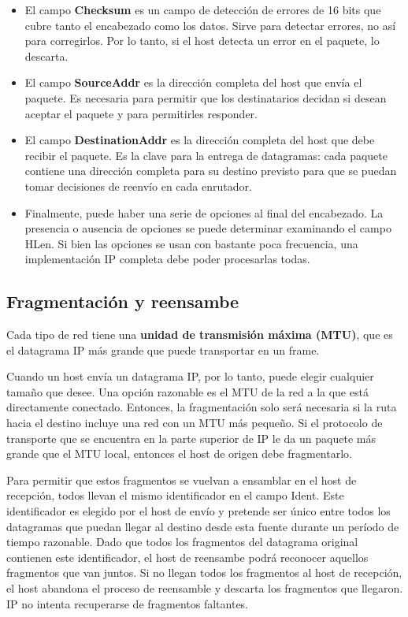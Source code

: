 \begin{itemize}
  \item El campo \textbf{Checksum} es un campo de detección de errores de 16 bits que cubre tanto el encabezado como los datos. Sirve para detectar errores, no así para corregirlos. Por lo tanto, si el host detecta un error en el paquete, lo descarta.
  \item El campo \textbf{SourceAddr} es la dirección completa del host que envía el paquete. Es necesaria para permitir que los destinatarios decidan si desean aceptar el paquete y para permitirles responder.
  \item El campo \textbf{DestinationAddr} es la dirección completa del host que debe recibir el paquete.  Es la clave para la entrega de datagramas: cada paquete contiene una dirección completa para su destino previsto para que se puedan tomar decisiones de reenvío en cada enrutador.
  \item Finalmente, puede haber una serie de opciones al final del encabezado. La presencia o ausencia de opciones se puede determinar examinando el campo HLen. Si bien las opciones se usan con bastante poca frecuencia, una implementación IP completa debe poder procesarlas todas.
\end{itemize}

\subsection{Fragmentación y reensambe}
Cada tipo de red tiene una \textbf{unidad de transmisión máxima (MTU)}, que es el datagrama IP más grande que puede transportar en un frame.

Cuando un host envía un datagrama IP, por lo tanto, puede elegir cualquier tamaño que desee. Una opción razonable es el MTU de la red a la que está directamente conectado. Entonces, la fragmentación solo será necesaria si la ruta hacia el destino incluye una red con un MTU más pequeño. Si el protocolo de transporte que se encuentra en la parte superior de IP le da un paquete más grande que el MTU local, entonces el host de origen debe fragmentarlo.

Para permitir que estos fragmentos se vuelvan a ensamblar en el host de recepción, todos llevan el mismo identificador en el campo Ident. Este identificador es elegido por el host de envío y pretende ser único entre todos los datagramas que puedan llegar al destino desde esta fuente durante un período de tiempo razonable. Dado que todos los fragmentos del datagrama original contienen este identificador, el host de reensambe podrá reconocer aquellos fragmentos que van juntos. Si no llegan todos los fragmentos al host de recepción, el host abandona el proceso de reensamble y descarta los fragmentos que llegaron. IP no intenta recuperarse de fragmentos faltantes.


